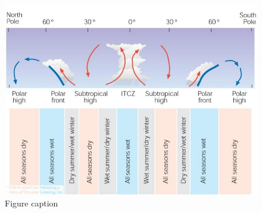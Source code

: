\documentclass[12pt,oneside]{book}
\begin{document}
\begin{figure}

{\centering \includegraphics[width=0.8\linewidth]{figures/Figure514} 

}

\caption{Figure caption}\label{fig:Fig514}
\end{figure}
\end{document}
